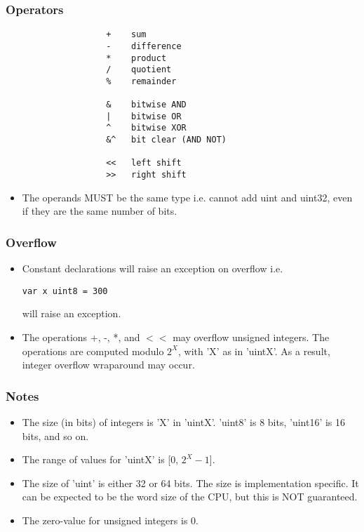 \documentclass{article}
\begin{document}
		\subsubsection{Operators}
			\begin{verbatim}
				    +    sum  
				    -    difference   
				    *    product       
				    /    quotient     
				    %    remainder  

				    &    bitwise AND    
				    |    bitwise OR    
				    ^    bitwise XOR   
				    &^   bit clear (AND NOT) 

				    <<   left shift
				    >>   right shift
			\end{verbatim}	
			\begin{itemize}
				\item The operands MUST be the same type i.e. cannot add uint and uint32, even if they are the same number of bits.  
			\end{itemize}
		\subsubsection{Overflow}
			\begin{itemize}
				\item Constant declarations will raise an exception on overflow i.e. \begin{verbatim}var x uint8 = 300\end{verbatim} will raise an exception.
				\item The operations +, -, *, and \(<<\) may overflow unsigned integers. The operations are computed modulo \(2^X\), with 'X' as in 'uintX'. As a result, integer overflow wraparound may occur. 
			\end{itemize}
		\subsubsection{Notes}
			\begin{itemize}
				\item The size (in bits) of integers is 'X' in 'uintX'. 'uint8' is 8 bits, 'uint16' is 16 bits, and so on. 
				\item The range of values for 'uintX' is [0, \(2^X - 1\)].
				\item The size of 'uint' is either 32 or 64 bits. The size is implementation specific. It can be expected to be the word size of the CPU, but this is NOT guaranteed.
				\item The zero-value for unsigned integers is \colorbox{code}{0}.
			\end{itemize} 
			
\end{document}
